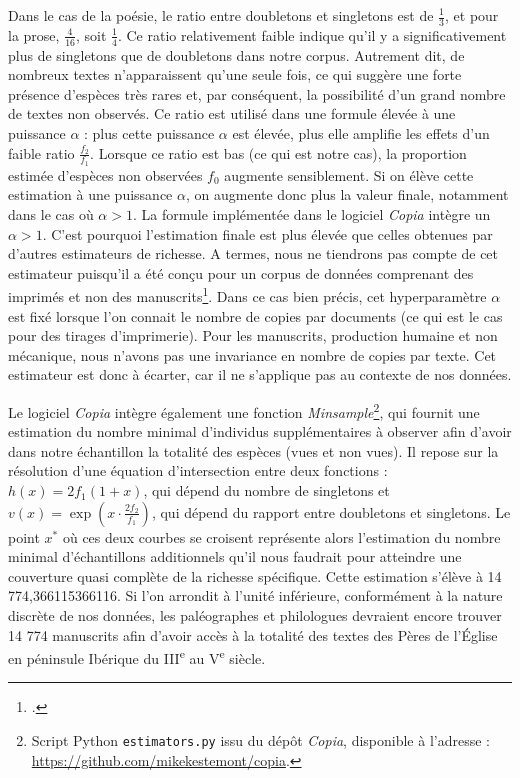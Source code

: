\documentclass[a4paper,twoside,12pt]{book}
\begin{document}
Dans le cas de la poésie, le ratio entre doubletons et singletons est de \( \frac{1}{3} \), et pour la prose, \( \frac{4}{16} \), soit \( \frac{1}{4} \). Ce ratio relativement faible indique qu’il y a significativement plus de singletons que de doubletons dans notre corpus. Autrement dit, de nombreux textes n’apparaissent qu’une seule fois, ce qui suggère une forte présence d’espèces très rares et, par conséquent, la possibilité d’un grand nombre de textes non observés. Ce ratio est utilisé dans une formule élevée à une puissance \(\alpha\)  : plus cette puissance \(\alpha\) est élevée, plus elle amplifie les effets d’un faible ratio \( \frac{f_2}{f_1} \). Lorsque ce ratio est bas (ce qui est notre cas), la proportion estimée d’espèces non observées \(f_0\) augmente sensiblement. Si on élève cette estimation à une puissance \(\alpha\), on augmente donc plus la valeur finale, notamment dans le cas où \(\alpha > 1\). La formule implémentée dans le logiciel \textit{Copia} intègre un \(\alpha > 1\). C'est pourquoi l'estimation finale est plus élevée que celles obtenues par d'autres estimateurs de richesse. A termes, nous ne tiendrons pas compte de cet estimateur puisqu'il a été conçu pour un corpus de données comprenant des imprimés et non des manuscrits\footcite{egghe2007lost}. Dans ce cas bien précis, cet hyperparamètre \(\alpha\) est fixé lorsque l'on connait le nombre de copies par documents (ce qui est le cas pour des tirages d'imprimerie). Pour les manuscrits, production humaine et non mécanique, nous n'avons pas une invariance en nombre de copies par texte. Cet estimateur est donc à écarter, car il ne s'applique pas au contexte de nos données.

Le logiciel \textit{Copia} intègre également une fonction \textit{Minsample}\footnote{Script Python \texttt{estimators.py} issu du dépôt \textit{Copia}, disponible à l'adresse :  \url{https://github.com/mikekestemont/copia}.}, qui fournit une estimation du nombre minimal d’individus supplémentaires à observer afin d'avoir dans notre échantillon la totalité des espèces (vues et non vues). Il repose sur la résolution d’une équation d’intersection entre deux fonctions : \( h(x) = 2f_1(1 + x) \), qui dépend du nombre de singletons et \( v(x) = \exp\left(x \cdot \frac{2f_2}{f_1}\right) \), qui dépend du rapport entre doubletons et singletons. Le point \( x^* \) où ces deux courbes se croisent représente alors l'estimation du nombre minimal d’échantillons additionnels qu'il nous faudrait pour atteindre une couverture quasi complète de la richesse spécifique. Cette estimation s’élève à 14 774,366115366116. Si l’on arrondit à l’unité inférieure, conformément à la nature discrète de nos données, les paléographes et philologues devraient encore trouver 14 774 manuscrits afin d'avoir accès à la totalité des textes des Pères de l’Église en péninsule Ibérique du III\textsuperscript{e} au V\textsuperscript{e} siècle.
\end{document}
